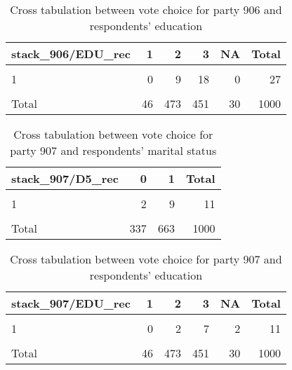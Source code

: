 \documentclass[
]{article}
\begin{document}
\begin{table}

\caption{\label{tab:unnamed-chunk-58}Cross tabulation between vote choice for party 906 and respondents' education 
                   \label{table:crosstab_1_ee}}
\centering
\begin{tabular}[t]{l|r|r|r|r|r}
\hline
stack\_906/EDU\_rec & 1 & 2 & 3 & NA & Total\\
\hline
\cellcolor{gray!6}{0} & \cellcolor{gray!6}{46} & \cellcolor{gray!6}{456} & \cellcolor{gray!6}{425} & \cellcolor{gray!6}{29} & \cellcolor{gray!6}{956}\\
\hline
1 & 0 & 9 & 18 & 0 & 27\\
\hline
\cellcolor{gray!6}{NA} & \cellcolor{gray!6}{0} & \cellcolor{gray!6}{8} & \cellcolor{gray!6}{8} & \cellcolor{gray!6}{1} & \cellcolor{gray!6}{17}\\
\hline
Total & 46 & 473 & 451 & 30 & 1000\\
\hline
\end{tabular}
\end{table}

\begin{table}

\caption{\label{tab:unnamed-chunk-58}Cross tabulation between vote choice for party 907 and respondents' marital status
                   \label{table:crosstab_2_ee}}
\centering
\begin{tabular}[t]{l|r|r|r}
\hline
stack\_907/D5\_rec & 0 & 1 & Total\\
\hline
\cellcolor{gray!6}{0} & \cellcolor{gray!6}{328} & \cellcolor{gray!6}{644} & \cellcolor{gray!6}{972}\\
\hline
1 & 2 & 9 & 11\\
\hline
\cellcolor{gray!6}{NA} & \cellcolor{gray!6}{7} & \cellcolor{gray!6}{10} & \cellcolor{gray!6}{17}\\
\hline
Total & 337 & 663 & 1000\\
\hline
\end{tabular}
\end{table}

\begin{table}

\caption{\label{tab:unnamed-chunk-58}Cross tabulation between vote choice for party 907 and respondents' education 
                   \label{table:crosstab_3_ee}}
\centering
\begin{tabular}[t]{l|r|r|r|r|r}
\hline
stack\_907/EDU\_rec & 1 & 2 & 3 & NA & Total\\
\hline
\cellcolor{gray!6}{0} & \cellcolor{gray!6}{46} & \cellcolor{gray!6}{463} & \cellcolor{gray!6}{436} & \cellcolor{gray!6}{27} & \cellcolor{gray!6}{972}\\
\hline
1 & 0 & 2 & 7 & 2 & 11\\
\hline
\cellcolor{gray!6}{NA} & \cellcolor{gray!6}{0} & \cellcolor{gray!6}{8} & \cellcolor{gray!6}{8} & \cellcolor{gray!6}{1} & \cellcolor{gray!6}{17}\\
\hline
Total & 46 & 473 & 451 & 30 & 1000\\
\hline
\end{tabular}
\end{table}
\end{document}
